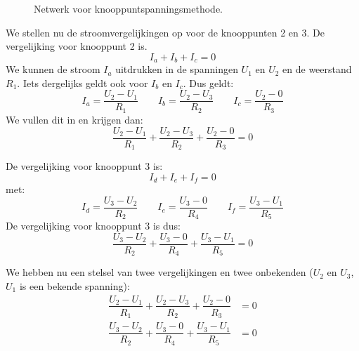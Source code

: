 \begin{figure}[!ht]
\centering
{}
\caption{Netwerk voor knooppuntspanningsmethode.}
\label{fig:gelnetwerkvoornodalanalysis2}
\end{figure}

We stellen nu de stroomvergelijkingen op voor de knooppunten 2 en 3. De vergelijking voor knooppunt 2 is.
%
\begin{equation}
I_a+I_b+I_c = 0
\end{equation}
%
We kunnen de stroom $I_a$ uitdrukken in de spanningen $U_1$ en $U_2$ en de weerstand $R_1$. Iets dergelijks geldt ook voor $I_b$ en $I_c$. Dus geldt:
%
\begin{equation}
I_a = \dfrac{U_2-U_1}{R_1} \qquad I_b = \dfrac{U_2-U_3}{R_2} \qquad I_c = \dfrac{U_2-0}{R_3}
\end{equation}
%
We vullen dit in en krijgen dan:
%
\begin{equation}
\dfrac{U_2-U_1}{R_1} + \dfrac{U_2 - U_3}{R_2} + \dfrac{U_2-0}{R_3} = 0
\end{equation}

%
De vergelijking voor knooppunt 3 is:
%
\begin{equation}
I_d + I_e + I_f = 0
\end{equation}
%
met:
%
\begin{equation}
I_d = \dfrac{U_3-U_2}{R_2} \qquad I_e = \dfrac{U_3-0}{R_4} \qquad I_f = \dfrac{U_3-U_1}{R_5}
\end{equation}
%
De vergelijking voor knooppunt 3 is dus:
%
\begin{equation}
\dfrac{U_3-U_2}{R_2} + \dfrac{U_3 - 0}{R_4} +  \dfrac{U_3-U_1}{R_5} = 0
\end{equation}

We hebben nu een stelsel van twee vergelijkingen en twee onbekenden ($U_2$ en $U_3$, $U_1$ is een bekende spanning):
%
\begin{equation}
\begin{split}
\dfrac{U_2-U_1}{R_1} + \dfrac{U_2 - U_3}{R_2} + \dfrac{U_2-0}{R_3} &= 0 \\[.5em]
\dfrac{U_3-U_2}{R_2} + \dfrac{U_3 - 0}{R_4} +  \dfrac{U_3-U_1}{R_5} &= 0
\end{split}
\end{equation}

